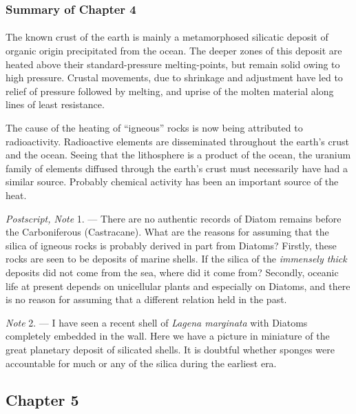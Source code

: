 \documentclass[a4paper, 12pt, oneside, landscape]{article}
\begin{document}
\subsubsection{Summary of Chapter 4} 
\paragraph{}
The known crust of the earth is mainly a metamorphosed silicatic deposit of organic origin precipitated from the ocean. The deeper zones of this deposit are heated above their standard-pressure melting-points, but remain solid owing to high pressure. Crustal movements, due to shrinkage and adjustment have led to relief of pressure followed by melting, and uprise of the molten material along lines of least resistance.

The cause of the heating of ``igneous'' rocks is now being attributed to radioactivity. Radioactive elements are disseminated throughout the earth's crust and the ocean. Seeing that the lithosphere is a product of the ocean, the uranium family of elements diffused through the earth's crust must necessarily have had a similar source. Probably chemical activity has been an important source of the heat.

\emph{Postscript, Note} 1. --- There are no authentic records of Diatom remains before the Carboniferous (Castracane). What are the reasons for assuming that the silica of igneous rocks is probably derived in part from Diatoms? Firstly, these rocks are seen to be deposits of marine shells. If the silica of the \emph{immensely thick} deposits did not come from the sea, where did it come from? Secondly, oceanic life at present depends on unicellular plants and especially on Diatoms, and there is no reason for assuming that a different relation held in the past.

\emph{Note} 2. --- I have seen a recent shell of \emph{Lagena marginata} with Diatoms completely embedded in the wall. Here we have a picture in miniature of the great planetary deposit of silicated shells. It is doubtful whether sponges were accountable for much or any of the silica during the earliest era.
\clearpage
\subsection{Chapter 5}
\end{document}
